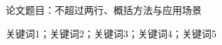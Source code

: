 \begin{center}
  {\heiti 论文题目：不超过两行、概括方法与应用场景}
\end{center}

\vspace{1.5em}



\vspace{1em}

{ 关键词1；关键词2；关键词3；关键词4；关键词5}

\clearpage
